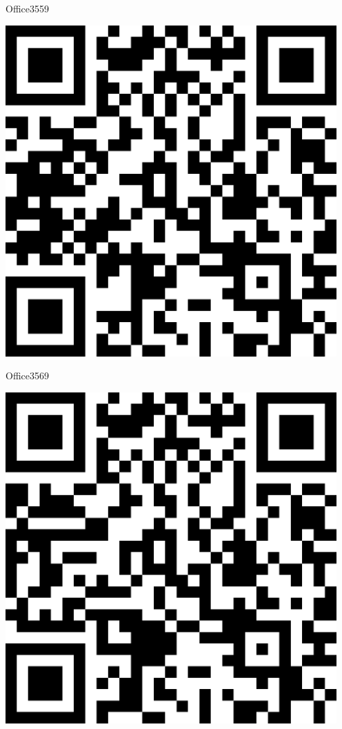 \documentclass[letterpaper]{article}
\begin{document}
 \hfill{\small Office3559} 

 \vspace{1in} 
 \pagebreak 
{} 
 \vspace*{\fill} 
 \begingroup 
 \centerline{\includegraphics[scale=1,width=5in,height=5in]{Office3569.png}} 
 \endgroup 
 \vspace*{\fill} 

 \hfill{\small Office3569} 

 \vspace{1in} 
 \pagebreak 
{} 
 \vspace*{\fill} 
 \begingroup 
 \centerline{\includegraphics[scale=1,width=5in,height=5in]{Office3571.png}} 
 \endgroup 
 \vspace*{\fill} 
\end{document}
